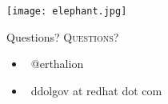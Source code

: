 \documentclass[usenames,dvipsnames, 18pt, compress, aspectratio=169]{beamer}
\def\twitter{{\faTwitter}}
\def\email{{\faEnvelope}}
\begin{document}
\begin{frame}
    \frametitle{}
    \begin{center}
        \texttt{[image: elephant.jpg]}
    \end{center}
\end{frame}

\fontsize{18pt}{18}\selectfont
\begin{frame}
  \vspace*{2.5cm}
  \begin{minipage}[b][\paperheight]{\textwidth}
  \begin{center}

      \linespread{1.0}%
      \if@noSmallCapitals%
        Questions?
      \else%
        \scshape{\color{black} Questions?}%
      \fi%
      \vspace*{0.3em}

      \fontsize{13pt}{14}\selectfont
        \begin{itemize}[label={}]
            \item {\color{black} \twitter\ @erthalion}
            \item {\color{black} \email\ ddolgov at redhat dot com}
        \end{itemize}
      \vspace*{2.5em}%

    \vfill
    \vspace*{2em}
  \end{center}
  \end{minipage}

\end{frame}
\end{document}
